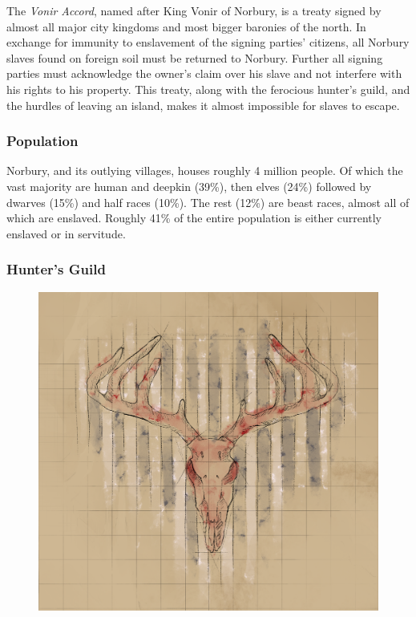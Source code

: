 The \emph{Vonir Accord}, named after King Vonir of Norbury, is a treaty signed
by almost all major city kingdoms and most bigger baronies of the north. In
exchange for immunity to enslavement of the signing parties' citizens, all
Norbury slaves found on foreign soil must be returned to Norbury. Further all
signing parties must acknowledge the owner's claim over his slave and not
interfere with his rights to his property. This treaty, along with the
ferocious hunter's guild, and the hurdles of leaving an island, makes it almost
impossible for slaves to escape.

\subsubsection*{Population}

Norbury, and its outlying villages, houses roughly 4 million people. Of which
the vast majority are human and deepkin (39\%), then elves (24\%) followed by
dwarves (15\%) and half races (10\%). The rest (12\%) are beast races, almost
all of which are enslaved. Roughly 41\% of the entire population is either
currently enslaved or in servitude.

\subsubsection*{Hunter's Guild}

\begin{figure}[!ht]
  \centering
  \includegraphics[width=0.9\linewidth]{media/norbury-huntersguildsm.png}
\end{figure}

